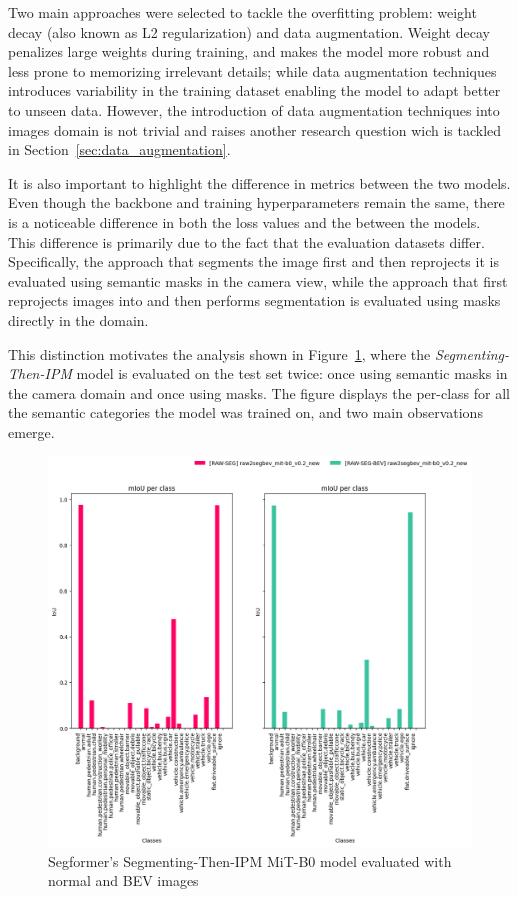 Two main approaches were selected to tackle the overfitting problem: weight decay (also known as L2 regularization) and data augmentation. Weight decay penalizes large weights during training, and makes the model more robust and less prone to memorizing irrelevant details; while data augmentation techniques introduces variability in the training dataset enabling the model to adapt better to unseen data. However, the introduction of data augmentation techniques into  images domain is not trivial and raises another research question wich is tackled in Section~\ref{sec:data_augmentation}.

It is also important to highlight the difference in metrics between the two models. Even though the backbone and training hyperparameters remain the same, there is a noticeable difference in both the loss values and the  between the models. This difference is primarily due to the fact that the evaluation datasets differ. Specifically, the approach that segments the image first and then reprojects it is evaluated using semantic masks in the camera view, while the approach that first reprojects images into  and then performs segmentation is evaluated using masks directly in the  domain.

This distinction motivates the analysis shown in Figure~\ref{fig:normal_vs_bev_evaluation}, where the \textit{Segmenting-Then-IPM} model is evaluated on the test set twice: once using semantic masks in the camera domain and once using  masks. The figure displays the per-class  for all the semantic categories the model was trained on, and two main observations emerge.

\begin{figure}[h!]
    \centering
    \includegraphics[width=0.8\linewidth]{./images/experiments/raw2segbev_mit-b0_v0.2_new_test_evaluation.png}
    \caption{Segformer's Segmenting-Then-IPM MiT-B0 model evaluated with normal and BEV images}
    \label{fig:normal_vs_bev_evaluation}
\end{figure}

